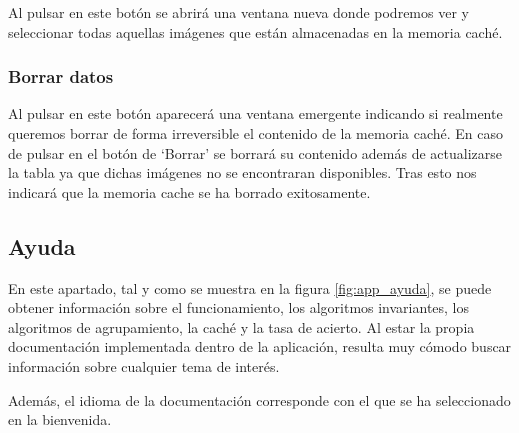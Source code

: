 Al pulsar en este botón se abrirá una ventana nueva donde podremos ver y seleccionar todas aquellas imágenes que están almacenadas en la memoria caché.

\subsubsection{Borrar datos}\label{borrar-datos}

Al pulsar en este botón aparecerá una ventana emergente indicando si realmente queremos borrar de forma irreversible el contenido de la memoria caché. En caso de pulsar en el botón de `Borrar' se borrará su contenido además de actualizarse la tabla ya que dichas imágenes no se encontraran disponibles. Tras esto nos indicará que la memoria cache se ha borrado exitosamente.

\subsection{Ayuda}\label{ayuda}

En este apartado, tal y como se muestra en la figura \ref{fig:app_ayuda}, se puede obtener información sobre el funcionamiento, los algoritmos invariantes, los algoritmos de agrupamiento, la caché y la tasa de acierto. Al estar la propia documentación implementada dentro de la aplicación, resulta muy cómodo buscar información sobre cualquier tema de interés. 

Además, el idioma de la documentación corresponde con el que se ha seleccionado en la bienvenida.

